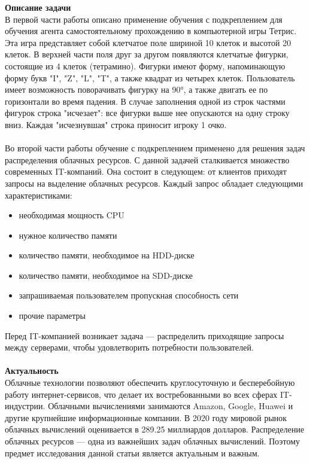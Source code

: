 \documentclass{article}
\begin{document}
\textbf{Описание задачи}\\
В первой части работы описано применение обучения с подкреплением для обучения агента самостоятельному прохождению в компьютерной игры Тетрис\cite{litlink1}. Эта игра представляет собой клетчатое поле шириной 10 клеток и высотой 20 клеток. В верхней части поля друг за другом появляются клетчатые фигурки, состоящие из 4 клеток (тетрамино). Фигурки имеют форму, напоминающую форму букв "I", "Z", "L", "T", а также квадрат из четырех клеток. Пользователь имеет возможность поворачивать фигурку на 90°, а также двигать ее по горизонтали во время падения. В случае заполнения одной из строк частями фигурок строка "исчезает": все фигурки выше нее опускаются на одну строку вниз. Каждая "исчезнувшая" строка приносит игроку 1 очко.\\
~\\
Во второй части работы обучение с подкреплением применено для решения задач распределения облачных ресурсов. С данной задачей сталкивается множество современных IT-компаний. Она состоит в следующем: от клиентов приходят запросы на выделение облачных ресурсов. Каждый запрос обладает следующими характеристиками:\\
\begin{itemize}
\item необходимая мощность CPU
\item нужное количество памяти
\item количество памяти, необходимое на HDD-диске
\item количество памяти, необходимое на SDD-диске
\item запрашиваемая пользователем пропускная способность сети
\item прочие параметры
\end{itemize}
Перед IT-компанией возникает задача — распределить приходящие запросы между серверами, чтобы удовлетворить потребности пользователей.\\
~\\
\textbf{Актуальность}\\
Облачные технологии позволяют обеспечить круглосуточную и бесперебойную работу интернет-сервисов, что делает их востребованными во всех сферах IT-индустрии. Облачными вычислениями занимаются Amazon, Google, Huawei и другие крупнейшие информационные компании\cite{litlink2}\cite{litlink3}. В 2020 году мировой рынок облачных вычислений оценивается в 289.25 миллиардов долларов\cite{litlink4}. Распределение облачных ресурсов — одна из важнейших задач облачных вычислений. Поэтому предмет исследования данной статьи является актуальным и важным.\\
\end{document}
